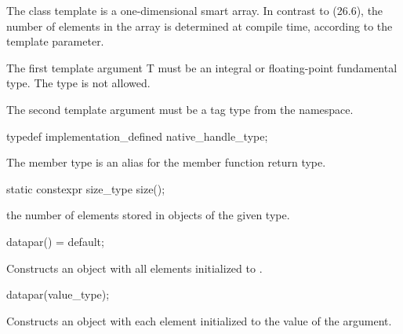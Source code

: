 

\pnum The class template \datapar{} is a one-dimensional smart array.
In contrast to  (26.6), the number of elements in the array is determined at compile time, according to the  template parameter.

\pnum The first template argument \type T must be an integral or floating-point fundamental type.
The type \bool is not allowed.

\pnum The second template argument  must be a tag type from the  namespace.

\begin{itemdecl}
typedef implementation_defined native_handle_type;
\end{itemdecl}
\begin{itemdescr}
  \pnum
  The  member type is an alias for the  member function return type.
\end{itemdescr}


\begin{itemdecl}
static constexpr size_type size();
\end{itemdecl}
\begin{itemdescr}
  \pnum\returns the number of elements stored in objects of the given \datapar[<T, Abi>] type.
\end{itemdescr}

\begin{itemdecl}
datapar() = default;
\end{itemdecl}
\begin{itemdescr}
  \pnum
  \effects
  Constructs an object with all elements initialized to .
\end{itemdescr}

\begin{itemdecl}
datapar(value_type);
\end{itemdecl}
\begin{itemdescr}
  \pnum
  \effects
  Constructs an object with each element initialized to the value of the argument.
\end{itemdescr}

